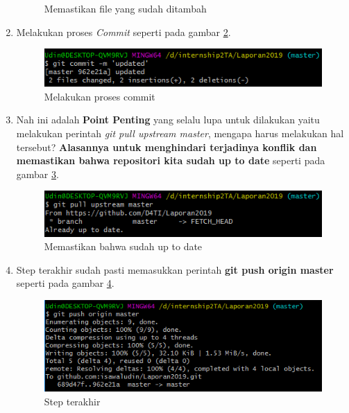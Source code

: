 \begin{enumerate}
\begin{figure}[!htbp]
      \caption{Memastikan file yang sudah ditambah}
      \label{fig:status1}
      \end{figure}
  \item Melakukan proses \textit{Commit} seperti pada gambar \ref{fig:commit}.
      \begin{figure}[!htbp]
      \centerline{\includegraphics[width=.75\textwidth]{Figures/manajemenkonflik/commit.png}}
      \caption{Melakukan proses commit}
      \label{fig:commit}
      \end{figure}
  \item Nah ini adalah \textbf{Point Penting} yang selalu lupa untuk dilakukan yaitu melakukan perintah \textit{git pull upstream master}, mengapa harus melakukan hal tersebut? \textbf{Alasannya untuk menghindari terjadinya konflik dan memastikan bahwa repositori kita sudah up to date} seperti pada gambar \ref{fig:pull}.
      \begin{figure}[!htbp]
      \centerline{\includegraphics[width=.75\textwidth]{Figures/manajemenkonflik/pull.png}}
      \caption{Memastikan bahwa sudah up to date}
      \label{fig:pull}
      \end{figure}
  \item Step terakhir sudah pasti memasukkan perintah \textbf{git push origin master} seperti pada gambar \ref{fig:push}.
      \begin{figure}[!htbp]
      \centerline{\includegraphics[width=.75\textwidth]{Figures/manajemenkonflik/push.png}}
      \caption{Step terakhir}
      \label{fig:push}
      \end{figure}
\end{enumerate}

